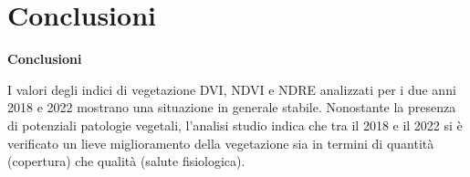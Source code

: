 \documentclass{beamer}
\begin{document}
\section{Conclusioni}

\begin{frame}
{\Large\textbf{Conclusioni}}

I valori degli indici di vegetazione DVI, NDVI e NDRE analizzati per i due anni 2018 e 2022 mostrano una situazione in generale stabile.
Nonostante la presenza di potenziali patologie vegetali, l'analisi studio indica che tra il 2018 e il 2022 si è verificato un lieve miglioramento della vegetazione sia in termini di quantità (copertura) che qualità (salute fisiologica).
\end{frame}
\end{document}
